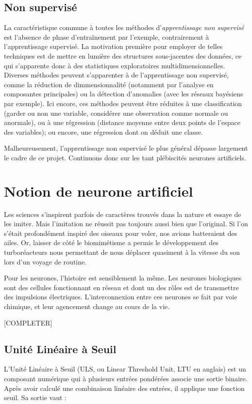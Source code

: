 \subsection{Non supervisé}
La caractéristique commune à toutes les méthodes d'\emph{apprentissage non supervisé} est l'absence de phase d'entraînement par l'exemple, contrairement à l'apprentissage supervisé. La motivation première pour employer de telles techniques est de mettre en lumière des structures sous-jacentes des données, ce qui s'apparente donc à des statistiques exploratoires multidimensionnelles. Diverses méthodes peuvent s'apparenter à de l'apprentissage non supervisé, comme la réduction de dimmensionnalité (notamment par l'analyse en composantes principales) ou la détection d'anomalies (avec les réseaux bayésiens par exemple). Ici encore, ces méthodes peuvent être réduites à une classification (garder ou non une variable, considérer une observation comme normale ou anormale), ou à une régression (distance moyenne entre deux points de l'espace des variables); ou encore, une régression dont on déduit une classe. 

Malheureusement, l'apprentissage non supervisé le plus général dépasse largement le cadre de ce projet. Continuons donc sur les tant plébiscités neurones artificiels.


\section{Notion de neurone artificiel}
Les sciences s'inspirent parfois de caractères trouvés dans la nature et essaye de les imiter. Mais l'imitation ne réussit pas toujours aussi bien que l'original. Si l'on s'était profondément inspiré des oiseaux pour voler, nos avions batteraient des ailes. Or, laisser de côté le biomimétisme a permis le développement des turboréacteurs nous permettant de nous déplacer quasiment à la vitesse du son lors d'un voyage de routine.

Pour les neurones, l'histoire est sensiblement la même. Les neurones biologiques sont des cellules fonctionnant en réseau et dont un des rôles est de transmettre des impulsions électriques. L'interconnexion entre ces neurones se fait par voie chimique, et leur agencement change au cours de la vie.

[COMPLETER]

\subsection{Unité Linéaire à Seuil}
L'Unité Linéaire à Seuil (ULS, ou Linear Threshold Unit, LTU en anglais) est un composant numérique qui à plusieurs entrées pondérées associe une sortie binaire. Après avoir calculé une combinaison linéaire des entrées, il applique une fonction seuil. Sa sortie vaut :

